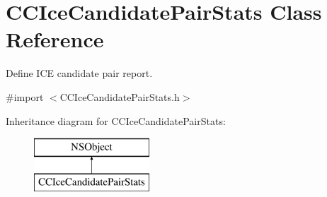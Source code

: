 \hypertarget{interface_c_c_ice_candidate_pair_stats}{}\section{C\+C\+Ice\+Candidate\+Pair\+Stats Class Reference}
\label{interface_c_c_ice_candidate_pair_stats}


Define I\+CE candidate pair report.  




{\ttfamily \#import $<$C\+C\+Ice\+Candidate\+Pair\+Stats.\+h$>$}

Inheritance diagram for C\+C\+Ice\+Candidate\+Pair\+Stats\+:\begin{figure}[H]
\begin{center}
\leavevmode
\includegraphics[height=2.000000cm]{interface_c_c_ice_candidate_pair_stats}
\end{center}
\end{figure}
